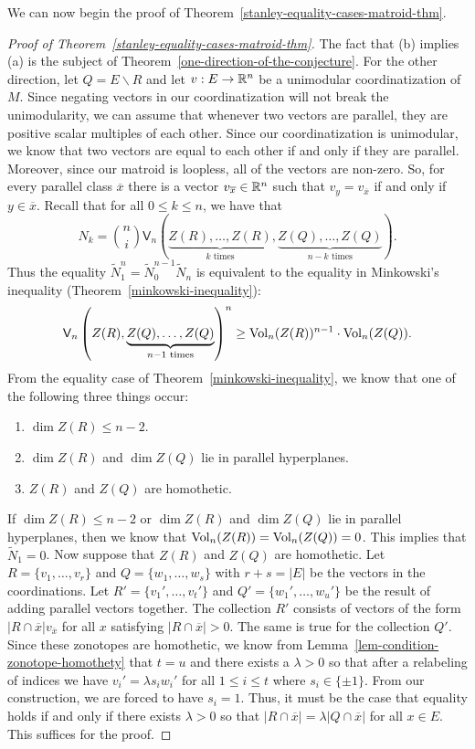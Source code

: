 \documentclass{puthesis-UG}
\begin{document}
We can now begin the proof of Theorem~\ref{stanley-equality-cases-matroid-thm}. 
\begin{proof}[Proof of Theorem~\ref{stanley-equality-cases-matroid-thm}]
	The fact that (b) implies (a) is the subject of Theorem~\ref{one-direction-of-the-conjecture}. For the other direction, let $Q = E \backslash R$ and let $v : E \to \mathbb{R}^n$ be a unimodular coordinatization of $M$. Since negating vectors in our coordinatization will not break the unimodularity, we can assume that whenever two vectors are parallel, they are positive scalar multiples of each other. Since our coordinatization is unimodular, we know that two vectors are equal to each other if and only if they are parallel. Moreover, since our matroid is loopless, all of the vectors are non-zero. So, for every parallel class $\overline{x}$ there is a vector $v_{\overline{x}} \in \mathbb{R}^n$ such that $v_y = v_{\overline{x}}$ if and only if $y \in \overline{x}$. Recall that for all $0 \leq k \leq n$, we have that 
	\[
		N_k = \binom{n}{i} \mathsf{V}_n \left ( \underbrace{Z(R), \ldots, Z(R)}_{k \text{ times}}, \underbrace{Z(Q), \ldots, Z(Q)}_{n-k \text{ times}} \right ). 
	\]
	Thus the equality $\widetilde{N}_1^n = \widetilde{N}_0^{n-1} \widetilde{N}_n$ is equivalent to the equality in Minkowski's inequality (Theorem~\ref{minkowski-inequality}):
	\[
		\mathsf{V}_n \left ( Z(R), \underbrace{Z(Q), \ldots, Z(Q)}_{n-1 \text{ times}} \right )^n \geq \operatorname{Vol}_n (Z(R))^{n-1} \cdot \operatorname{Vol}_n(Z(Q)).
	\]
	From the equality case of Theorem~\ref{minkowski-inequality}, we know that one of the following three things occur:
	\begin{enumerate}[label = (\arabic*)]
		\item $\dim Z(R) \leq n-2$. 
		\item $\dim Z(R)$ and $\dim Z(Q)$ lie in parallel hyperplanes. 
		\item $Z(R)$ and $Z(Q)$ are homothetic. 
	\end{enumerate}
	If $\dim Z(R) \leq n-2$ or $\dim Z(R)$ and $\dim Z(Q)$ lie in parallel hyperplanes, then we know that $\operatorname{Vol}_n (Z(R)) = \operatorname{Vol}_n(Z(Q)) = 0$. This implies that $\widetilde{N}_1 = 0$. Now suppose that $Z(R)$ and $Z(Q)$ are homothetic. Let $R = \{v_1, \ldots, v_r\}$ and $Q = \{w_1, \ldots, w_s\}$ with $r + s = |E|$ be the vectors in the coordinations. Let $R' = \{v_1', \ldots, v_t'\}$ and $Q' = \{w_1', \ldots, w_u'\}$ be the result of adding parallel vectors together. The collection $R'$ consists of vectors of the form $|R \cap \overline{x}| v_{\overline{x}}$ for all $x$ satisfying $|R \cap \overline{x}| > 0$. The same is true for the collection $Q'$. Since these zonotopes are homothetic, we know from Lemma~\ref{lem-condition-zonotope-homothety} that $t = u$ and there exists a $\lambda > 0$ so that after a relabeling of indices we have $v_i' = \lambda s_i w_i'$ for all $1 \leq i \leq t$ where $s_i \in \{\pm 1\}$. From our construction, we are forced to have $s_i = 1$. Thus, it must be the case that equality holds if and only if there exists $\lambda > 0$ so that $|R \cap \overline{x}| = \lambda |Q \cap \overline{x}|$ for all $x \in E$. This suffices for the proof. 
\end{proof}
\end{document}
